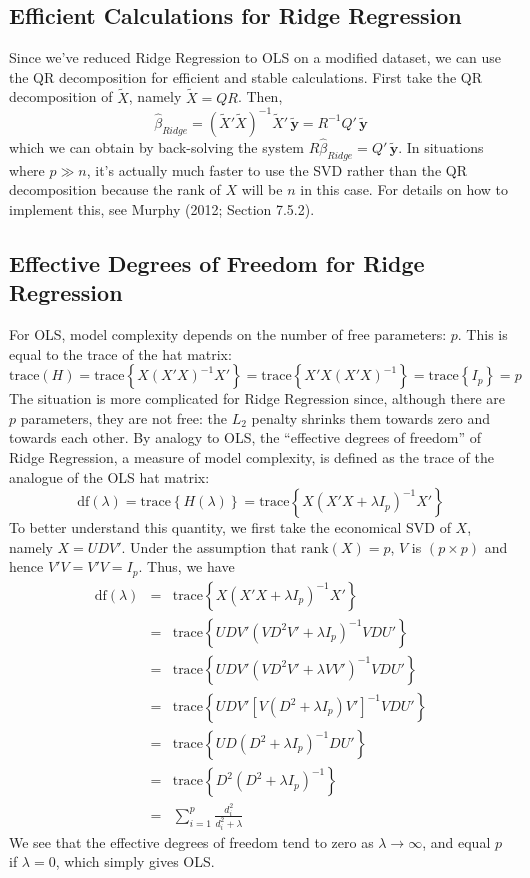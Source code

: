 \subsection{Efficient Calculations for Ridge Regression}
Since we've reduced Ridge Regression to OLS on a modified dataset, we can use the QR decomposition for efficient and stable calculations. First take the QR decomposition of $\widetilde{X}$, namely $\widetilde{X} = QR$. Then, 
	$$\widehat{\beta}_{Ridge} = (\widetilde{X}' \widetilde{X})^{-1} \widetilde{X}'\,\widetilde{\textbf{y}} = R^{-1} Q' \,\widetilde{\textbf{y}}$$
which we can obtain by back-solving the system $R\widehat{\beta}_{Ridge} = Q'\, \widetilde{\mathbf{y}}$. In situations where $p \gg n$, it's actually much faster to use the SVD rather than the QR decomposition because the rank of $X$ will be $n$ in this case. For details on how to implement this, see Murphy (2012; Section 7.5.2).

\subsection{Effective Degrees of Freedom for Ridge Regression}

For OLS, model complexity depends on the number of free parameters: $p$. This is equal to the trace of the hat matrix:
	$$\mbox{trace}(H) = \mbox{trace}\left\{ X(X'X)^{-1}X'\right\} = \mbox{trace}\left\{X'X(X'X)^{-1} \right\} = \mbox{trace}\left\{ I_p\right\}=p$$
The situation is more complicated for Ridge Regression since, although there are $p$ parameters, they are not free: the $L_2$ penalty shrinks them towards zero and towards each other. By analogy to OLS, the ``effective degrees of freedom'' of Ridge Regression, a measure of model complexity, is defined as the trace of the analogue of the OLS hat matrix:
	 $$\mbox{df}(\lambda) =\mbox{trace}\left\{ H(\lambda)\right\} =  \mbox{trace}\left\{ X(X'X + \lambda I_p)^{-1} X'\right\}$$
To better understand this quantity, we first take the economical SVD of $X$, namely $X = UDV'$. Under the assumption that $\mbox{rank}(X) = p$, $V$ is $(p\times p)$ and hence $V'V = V'V = I_p$. Thus, we have
	\begin{eqnarray*}
		\mbox{df}(\lambda) &=&  \mbox{trace}\left\{ X(X'X + \lambda I_p)^{-1} X'\right\}\\
		&=& \mbox{trace}\left\{UDV' (VD^2V' + \lambda I_p)^{-1}VDU' \right\}\\
		&=& \mbox{trace}\left\{UDV' (VD^2V' + \lambda VV')^{-1}VDU' \right\}\\
		&=& \mbox{trace}\left\{UDV' \left[V(D^2 + \lambda I_p)V' \right]^{-1}VDU' \right\}\\
		&=&\mbox{trace}\left\{UD(D^2 + \lambda I_p)^{-1}DU'\right\}\\
		&=& \mbox{trace}\left\{D^2(D^2 + \lambda I_p)^{-1}\right\}\\
		&=& \sum_{i=1}^p \frac{d_i^2}{d_i^2 + \lambda}
	\end{eqnarray*}
We see that the effective degrees of freedom tend to zero as $\lambda \rightarrow \infty$, and equal $p$ if $\lambda = 0$, which simply gives OLS. 


